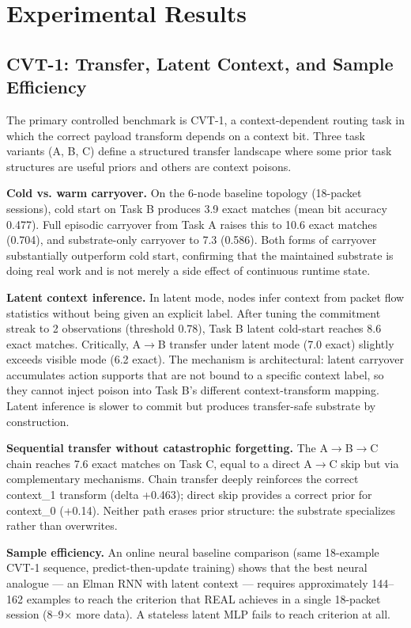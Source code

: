 \documentclass[letterpaper]{article}
\begin{document}
\section{Experimental Results}

\subsection{CVT-1: Transfer, Latent Context, and Sample Efficiency}

The primary controlled benchmark is CVT-1, a context-dependent routing task in which the correct payload transform depends on a context bit. Three task variants (A, B, C) define a structured transfer landscape where some prior task structures are useful priors and others are context poisons.

\textbf{Cold vs. warm carryover.} On the 6-node baseline topology (18-packet sessions), cold start on Task B produces 3.9 exact matches (mean bit accuracy 0.477). Full episodic carryover from Task A raises this to 10.6 exact matches (0.704), and substrate-only carryover to 7.3 (0.586). Both forms of carryover substantially outperform cold start, confirming that the maintained substrate is doing real work and is not merely a side effect of continuous runtime state.

\textbf{Latent context inference.} In latent mode, nodes infer context from packet flow statistics without being given an explicit label. After tuning the commitment streak to 2 observations (threshold 0.78), Task B latent cold-start reaches 8.6 exact matches. Critically, A$\rightarrow$B transfer under latent mode (7.0 exact) slightly exceeds visible mode (6.2 exact). The mechanism is architectural: latent carryover accumulates action supports that are not bound to a specific context label, so they cannot inject poison into Task B's different context-transform mapping. Latent inference is slower to commit but produces transfer-safe substrate by construction.

\textbf{Sequential transfer without catastrophic forgetting.} The A$\rightarrow$B$\rightarrow$C chain reaches 7.6 exact matches on Task C, equal to a direct A$\rightarrow$C skip but via complementary mechanisms. Chain transfer deeply reinforces the correct context\_1 transform (delta +0.463); direct skip provides a correct prior for context\_0 (+0.14). Neither path erases prior structure: the substrate specializes rather than overwrites.

\textbf{Sample efficiency.} An online neural baseline comparison (same 18-example CVT-1 sequence, predict-then-update training) shows that the best neural analogue — an Elman RNN with latent context — requires approximately 144–162 examples to reach the criterion that REAL achieves in a single 18-packet session (8–9$\times$ more data). A stateless latent MLP fails to reach criterion at all.
\end{document}
